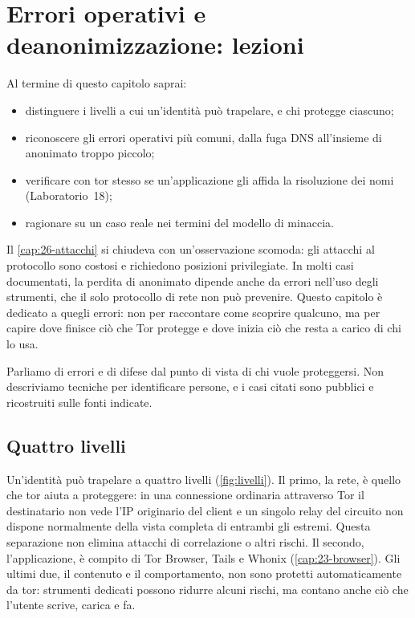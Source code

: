 \chapter{Errori operativi e deanonimizzazione: lezioni}\label{cap:28-opsec}

\begin{obiettivi}
Al termine di questo capitolo saprai:
\begin{itemize}[nosep]
  \item distinguere i livelli a cui un'identità può trapelare, e chi protegge ciascuno;
  \item riconoscere gli errori operativi più comuni, dalla fuga DNS all'insieme di anonimato troppo piccolo;
  \item verificare con tor stesso se un'applicazione gli affida la risoluzione dei nomi (Laboratorio~18);
  \item ragionare su un caso reale nei termini del modello di minaccia.
\end{itemize}
\end{obiettivi}

Il \cref{cap:26-attacchi} si chiudeva con un'osservazione scomoda: gli attacchi al protocollo sono costosi e richiedono posizioni privilegiate. In molti casi documentati, la perdita di anonimato dipende anche da errori nell'uso degli strumenti, che il solo protocollo di rete non può prevenire. Questo capitolo è dedicato a quegli errori: non per raccontare come scoprire qualcuno, ma per capire dove finisce ciò che Tor protegge e dove inizia ciò che resta a carico di chi lo usa.

\begin{attenzione}
Parliamo di errori e di difese dal punto di vista di chi vuole proteggersi. Non descriviamo tecniche per identificare persone, e i casi citati sono pubblici e ricostruiti sulle fonti indicate.
\end{attenzione}

\section{Quattro livelli}\label{sec:opsec-livelli}

Un'identità può trapelare a quattro livelli (\cref{fig:livelli}). Il primo, la rete, è quello che tor aiuta a proteggere: in una connessione ordinaria attraverso Tor il destinatario non vede l'IP originario del client e un singolo relay del circuito non dispone normalmente della vista completa di entrambi gli estremi. Questa separazione non elimina attacchi di correlazione o altri rischi. Il secondo, l'applicazione, è compito di Tor Browser, Tails e Whonix (\cref{cap:23-browser}). Gli ultimi due, il contenuto e il comportamento, non sono protetti automaticamente da tor: strumenti dedicati possono ridurre alcuni rischi, ma contano anche ciò che l'utente scrive, carica e fa.


